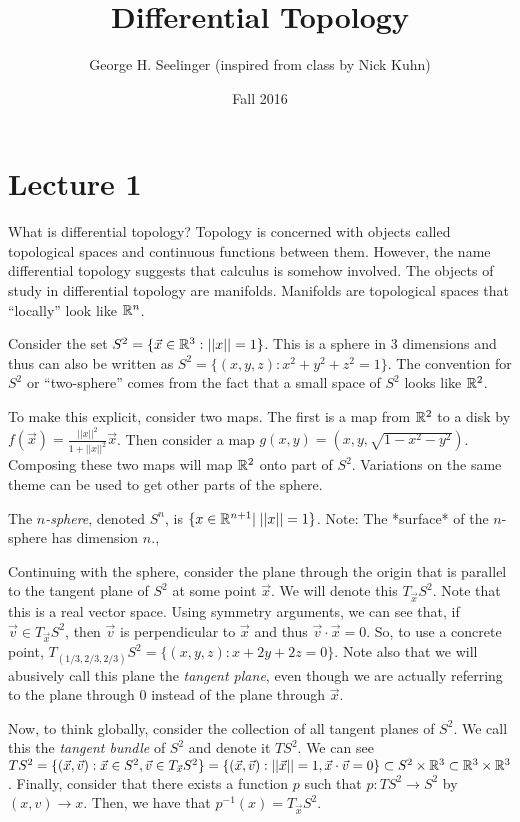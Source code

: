 \documentclass[11pt,leqno,oneside]{amsart}
\title[Differential Topology]{Differential Topology}
\author{George H. Seelinger (inspired from class by Nick Kuhn)}
\date{Fall 2016}
\begin{document}
\maketitle
\section{Lecture 1}

What is differential topology? Topology is concerned with objects called
topological spaces and continuous functions between them. However, the name
differential topology suggests that calculus is somehow involved. The objects of
study in differential topology are manifolds. Manifolds are topological spaces
that ``locally'' look like ${\mathbb R}^n$.

\begin{example}
	Consider the set $S^2 = \{ \vec{x} \in {\mathbb R}^3: ||x||=1\}$. This is a sphere
	in 3 dimensions and thus can also be written as $S^2 = \{(x,y,z) :
	x^2+y^2+z^2=1\}$. The convention for $S^2$ or ``two-sphere'' comes from the
	fact that a small space of $S^2$ looks like ${\mathbb R}^2$.

	To make this explicit, consider two maps. The first is a map from ${\mathbb R}^2$ to
	a disk by $f(\vec{x}) = \frac{||x||^2}{1+||x||^2} \vec{x}$. Then consider a
	map $g(x,y) = (x,y,\sqrt{1-x^2-y^2})$. Composing these two maps will map
	${\mathbb R}^2$ onto part of $S^2$. Variations on the same theme can be used to get
	other parts of the sphere.
\end{example}
\begin{defn}
	The \emph{$n$-sphere}, denoted $S^n$, is $\{x \in {\mathbb R}^{n+1} |\; ||x||=1 \}$. Note: The *surface* of the $n$-sphere has dimension $n$.,
\end{defn}
\begin{example}
	Continuing with the sphere, consider the plane through the origin that is parallel to the tangent plane of $S^2$ at some
	point $\vec{x}$. We will denote this $T_{\vec{x}}S^2$. Note that this is a
	real vector space. Using symmetry arguments, we can see that, if $\vec{v}
	\in T_{\vec{x}}S^2$, then $\vec{v}$ is perpendicular to $\vec{x}$ and thus
	$\vec{v} \cdot \vec{x} = 0$. So, to use a concrete point,
	$T_{(1/3,2/3,2/3)} S^2 = \{(x,y,z) : x+2y+2z=0\}$.  Note also that we will abusively call this plane the \emph{tangent plane}, even though we are actually referring to the plane through $0$ instead of the plane through $\vec{x}$.
\end{example}
\begin{example}
	Now, to think globally, consider the collection of all tangent planes of
	$S^2$. We call this the \emph{tangent bundle} of $S^2$ and denote it
	$TS^2$. We can see $TS^2 = \{(\vec{x}, \vec{v}): \vec{x} \in S^2, \vec{v}
	\in T_{\vec{x}} S^2\} = \{(\vec{x},\vec{v}) : ||\vec{x}|| = 1, \vec{x}
	\cdot \vec{v} = 0\} \subset S^2 \times {\mathbb R}^3 \subset {\mathbb R}^3 \times {\mathbb R}^3$.
	Finally, consider that there exists a function $p$ such that $p: TS^2 \to
	S^2$ by $(x,v) \to x$. Then, we have that $p^{-1}(x) = T_{\vec{x}}S^2$.
\end{example}
\end{document}
